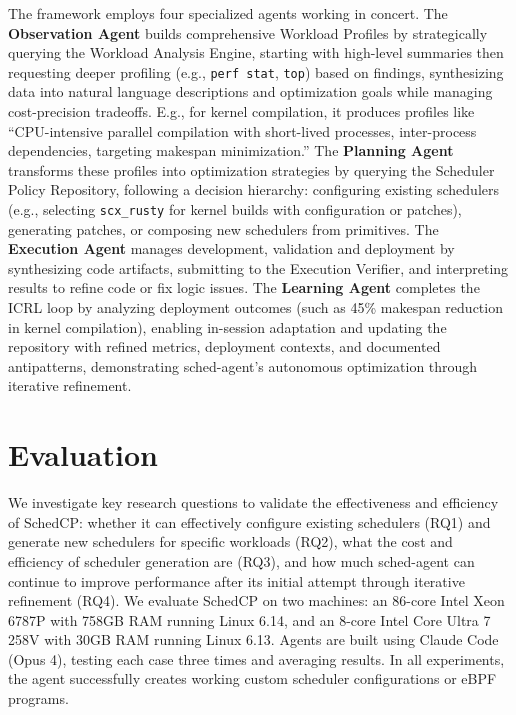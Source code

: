 \documentclass[preprint]{article}
\newcommand{\sys}{SchedCP\xspace}
\newcommand{\agent}{sched-agent\xspace}
\begin{document}
The framework employs four specialized agents working in concert. The \textbf{Observation Agent} builds comprehensive Workload Profiles by strategically querying the Workload Analysis Engine, starting with high-level summaries then requesting deeper profiling (e.g., \texttt{perf stat}, \texttt{top}) based on findings, synthesizing data into natural language descriptions and optimization goals while managing cost-precision tradeoffs. E.g., for kernel compilation, it produces profiles like ``CPU-intensive parallel compilation with short-lived processes, inter-process dependencies, targeting makespan minimization.'' The \textbf{Planning Agent} transforms these profiles into optimization strategies by querying the Scheduler Policy Repository, following a decision hierarchy: configuring existing schedulers (e.g., selecting \texttt{scx\_rusty} for kernel builds with configuration or patches), generating patches, or composing new schedulers from primitives. The \textbf{Execution Agent} manages development, validation and deployment by synthesizing code artifacts, submitting to the Execution Verifier, and interpreting results to refine code or fix logic issues. The \textbf{Learning Agent} completes the ICRL loop by analyzing deployment outcomes (such as 45\% makespan reduction in kernel compilation), enabling in-session adaptation and updating the repository with refined metrics, deployment contexts, and documented antipatterns, demonstrating \agent's autonomous optimization through iterative refinement.

\section{Evaluation}
\label{sec:evaluation}


We investigate key research questions to validate the effectiveness and efficiency of \sys: whether it can effectively configure existing schedulers (RQ1) and generate new schedulers for specific workloads (RQ2), what the cost and efficiency of scheduler generation are (RQ3), and how much \agent can continue to improve performance after its initial attempt through iterative refinement (RQ4). We evaluate \sys on two machines: an 86-core Intel Xeon 6787P with 758GB RAM running Linux 6.14, and an 8-core Intel Core Ultra 7 258V with 30GB RAM running Linux 6.13. Agents are built using Claude Code (Opus 4), testing each case three times and averaging results. In all experiments, the agent successfully creates working custom scheduler configurations or eBPF programs.
\end{document}
